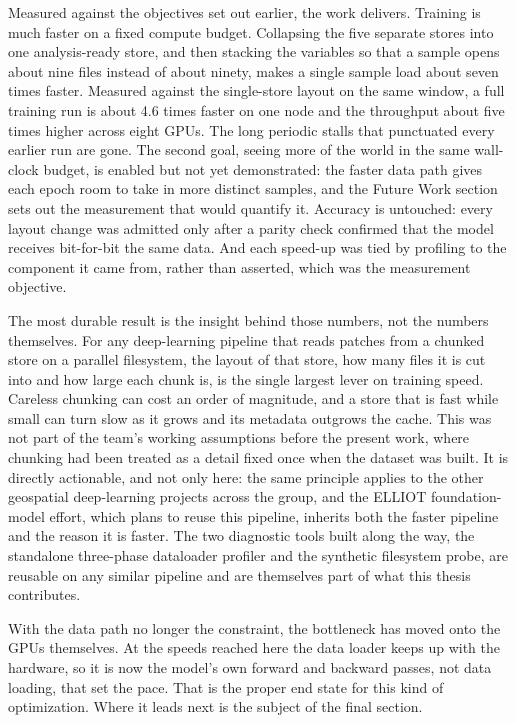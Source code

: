 \documentclass[12pt,a4paper]{article}
\begin{document}
Measured against the objectives set out earlier, the work delivers. Training is much faster on
a fixed compute budget. Collapsing the five separate stores into one analysis-ready store, and
then stacking the variables so that a sample opens about nine files instead of about ninety,
makes a single sample load about seven times faster. Measured against the single-store layout on
the same window, a full training run is about 4.6 times faster on one node and the throughput
about five times higher across eight GPUs. The long periodic stalls that punctuated every earlier
run are gone. The second goal, seeing more of the world in
the same wall-clock budget, is enabled but not yet demonstrated: the faster data path gives each
epoch room to take in more distinct samples, and the Future Work section sets out the measurement
that would quantify it. Accuracy is untouched: every layout
change was admitted only after a parity check confirmed that the model receives bit-for-bit the
same data. And each speed-up was tied by profiling to the component it came from, rather than
asserted, which was the measurement objective.

The most durable result is the insight behind those numbers, not the numbers themselves. For
any deep-learning pipeline that reads patches from a chunked store on a parallel filesystem, the
layout of that store, how many files it is cut into and how large each chunk is, is the single
largest lever on training speed. Careless chunking can cost an order of magnitude, and a store
that is fast while small can turn slow as it grows and its metadata outgrows the cache. This was
not part of the team's working assumptions before the present work, where chunking had been
treated as a detail fixed once when the dataset was built. It is directly actionable, and not
only here: the same principle applies to the other geospatial deep-learning projects across the
group, and the ELLIOT foundation-model effort, which plans to reuse this pipeline, inherits both
the faster pipeline and the reason it is faster. The two diagnostic tools built along the way,
the standalone three-phase dataloader profiler and the synthetic filesystem probe, are reusable
on any similar pipeline and are themselves part of what this thesis contributes.

With the data path no longer the constraint, the bottleneck has moved onto the GPUs themselves.
At the speeds reached here the data loader keeps up with the hardware, so it is now the model's
own forward and backward passes, not data loading, that set the pace. That is the proper end
state for this kind of optimization. Where it leads next is the subject of the final section.
\end{document}
